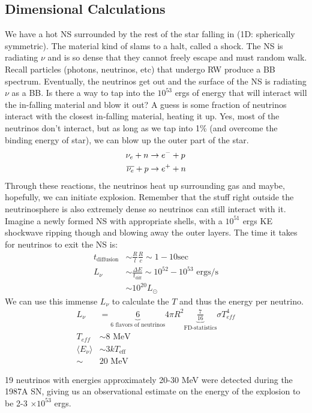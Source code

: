\subsection{Dimensional Calculations}
We have a hot NS surrounded by the rest of the star falling in (1D: spherically symmetric). The material kind of slams to a halt, called a shock. The NS is radiating $\nu$ and is so dense that they cannot freely escape and must random walk. Recall particles (photons, neutrinos, etc) that undergo RW produce a BB spectrum. Eventually, the neutrinos get out and the surface of the NS is radiating $\nu$ as a BB. Is there a way to tap into the $10^{53}$ ergs of energy that will interact will the in-falling material and blow it out? A guess is some fraction of neutrinos interact with the closest in-falling material, heating it up.  Yes, most of the neutrinos don't interact, but as long as we tap into 1\% (and overcome the binding energy of star), we can blow up the outer part of the star.
\begin{align}
\nu_e + n &\rightarrow e^- + p\\
\overline{\nu_e} + p &\rightarrow e^+ + n
\end{align}
Through these reactions, the neutrinos heat up surrounding gas and maybe, hopefully, we can initiate explosion. Remember that the stuff right outside the neutrinosphere is also extremely dense so neutrinos can still interact with it. \\

Imagine a newly formed NS with appropriate shells, with a $10^{51}$ ergs KE shockwave ripping though and blowing away the outer layers. The time it takes for neutrinos to exit the NS is:
\begin{align}
t_{\textrm{diffusion}} &\sim \frac{R}{l} \frac{R}{c} \sim 1-10 \textrm{sec}\\
L_\nu &\sim \frac{\Delta E}{t_{\textrm{diff}}} \sim 10^{52} -10^{53}\textrm{ ergs/s}\\
&\sim 10^{20} L_\odot
\end{align}
We can use this immense $L_\nu$ to calculate the $T$ and thus the energy per neutrino.
\begin{align}
L_\nu &= \underbrace{6}_{\textrm{6 flavors of neutrinos}} 4 \pi R^2 \underbrace{\frac{7}{16}}_{\textrm{FD-statistics}} \sigma T_{eff}^4\\
T_{eff} &\sim 8 \textrm{ MeV}\\
\langle E_\nu \rangle &\sim 3kT_{\textrm{eff}}\\
\sim &\textrm{20 MeV}
\end{align}

19 neutrinos with energies approximately 20-30 MeV were detected during the 1987A SN, giving us an observational estimate on the energy of the explosion to be 2-3 $\times 10^{53}$ ergs.